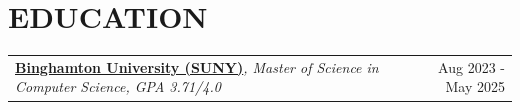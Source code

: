 \documentclass[a4paper,10pt]{extarticle}
\begin{document}
\vspace{2pt}

\section{{EDUCATION}}
\begin{tabularx}{\linewidth}{@{}>{\raggedright\arraybackslash}X r@{}}
\textbf{{\href{https://www.binghamton.edu/computer-science/graduate-programs/mscs/index.html}{Binghamton University (SUNY)}}}\textit{, Master of Science in Computer Science, GPA 3.71/4.0} & Aug 2023 - May 2025 \\
\end{tabularx}
\end{document}
